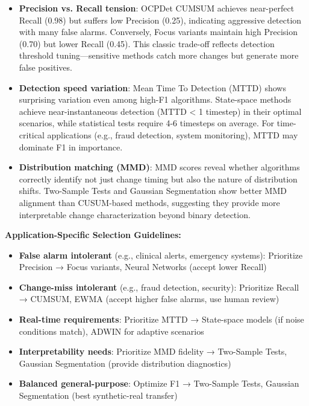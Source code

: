 \begin{itemize}
    \item \textbf{Precision vs. Recall tension}: OCPDet CUMSUM achieves near-perfect Recall (0.98) but suffers low Precision (0.25), indicating aggressive detection with many false alarms. Conversely, Focus variants maintain high Precision (0.70) but lower Recall (0.45). This classic trade-off reflects detection threshold tuning—sensitive methods catch more changes but generate more false positives.
    
    \item \textbf{Detection speed variation}: Mean Time To Detection (MTTD) shows surprising variation even among high-F1 algorithms. State-space methods achieve near-instantaneous detection (MTTD < 1 timestep) in their optimal scenarios, while statistical tests require 4-6 timesteps on average. For time-critical applications (e.g., fraud detection, system monitoring), MTTD may dominate F1 in importance.
    
    \item \textbf{Distribution matching (MMD)}: MMD scores reveal whether algorithms correctly identify not just change timing but also the nature of distribution shifts. Two-Sample Tests and Gaussian Segmentation show better MMD alignment than CUSUM-based methods, suggesting they provide more interpretable change characterization beyond binary detection.
\end{itemize}

\textbf{Application-Specific Selection Guidelines:}

\begin{itemize}
    \item \textbf{False alarm intolerant} (e.g., clinical alerts, emergency systems): Prioritize Precision → Focus variants, Neural Networks (accept lower Recall)
    \item \textbf{Change-miss intolerant} (e.g., fraud detection, security): Prioritize Recall → CUMSUM, EWMA (accept higher false alarms, use human review)
    \item \textbf{Real-time requirements}: Prioritize MTTD → State-space models (if noise conditions match), ADWIN for adaptive scenarios
    \item \textbf{Interpretability needs}: Prioritize MMD fidelity → Two-Sample Tests, Gaussian Segmentation (provide distribution diagnostics)
    \item \textbf{Balanced general-purpose}: Optimize F1 → Two-Sample Tests, Gaussian Segmentation (best synthetic-real transfer)
\end{itemize}


